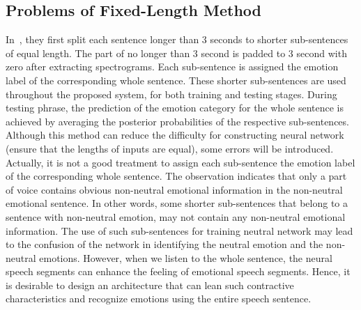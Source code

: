 \documentclass[a4paper]{article}
\begin{document}
\subsection{Problems of Fixed-Length Method}
\label{ssec:problem_fixed_len}

In~\cite{satt2017}, they first split each sentence longer than 3 seconds to shorter sub-sentences of equal length. The part of no longer than 3 second is padded to 3 second with zero after extracting spectrograms. Each sub-sentence is assigned the emotion label of the corresponding whole sentence. These shorter sub-sentences are used throughout the proposed system, for both training and testing stages. During testing phrase, the prediction of the emotion category for the whole sentence is achieved by averaging the posterior probabilities of the respective sub-sentences. Although this method can reduce the difficulty for constructing neural network (ensure that the lengths of inputs are equal), some errors will be introduced. Actually, it is not a good treatment to assign each sub-sentence the emotion label of the corresponding whole sentence. The observation indicates that only a part of voice contains obvious non-neutral emotional information in the non-neutral emotional sentence. In other words, some shorter sub-sentences that belong to a sentence with non-neutral emotion, may not contain any non-neutral emotional information. The use of such sub-sentences for training neutral network may lead to the confusion of the network in identifying the neutral emotion and the non-neutral emotions. However, when we listen to the whole sentence, the neural speech segments can enhance the feeling of emotional speech segments. Hence, it is desirable to design an architecture that can lean such contractive characteristics and recognize emotions using the entire speech sentence.


\end{document}
